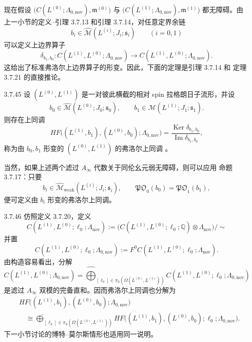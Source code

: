 现在假设
$\bigl(C(L^{(0)};\Lambda_{0,\mathrm{nov}}),\mathfrak m^{(0)}\bigr)$
与
$\bigl(C(L^{(1)};\Lambda_{0,\mathrm{nov}}),\mathfrak m^{(1)}\bigr)$
都无障碍。由上一小节的定义--引理 3.7.13 和引理 3.7.14，对任意定界余链
\[
 b_i\in\widehat{\mathcal M}(L^{(i)};J_i;\mathfrak s_i)
 \qquad(i=0,1)
\]
可以定义上边界算子
\[
 \delta_{b_1,b_0}\colon
 C(L^{(1)},L^{(0)};\Lambda_{0,\mathrm{nov}})
 \longrightarrow
 C(L^{(1)},L^{(0)};\Lambda_{0,\mathrm{nov}}).
\]
这给出了标准弗洛尔上边界算子的形变。因此，下面的定理是引理 3.7.14 和
定理 3.7.21 的直接推论。

\begin{theorem}{3.7.45}\label{thm:3-7-45}
设 $(L^{(0)},L^{(1)})$ 是一对彼此横截的相对 spin 拉格朗日子流形，并设
\[
 b_0\in\widehat{\mathcal M}(L^{(0)};J_0;\mathfrak s_0),
 \qquad
 b_1\in\widehat{\mathcal M}(L^{(1)};J_1;\mathfrak s_1).
\]
则存在上同调
\[
 HF\bigl((L^{(1)},b_1),(L^{(0)},b_0);
 \Lambda_{0,\mathrm{nov}}\bigr)
 =
 \frac{\operatorname{Ker}\delta_{b_1,b_0}}
      {\operatorname{Im}\delta_{b_1,b_0}},
\]
称为由 $b_0,b_1$ 形变的 $(L^{(0)},L^{(1)})$ 的弗洛尔上同调
。
\end{theorem}

当然，如果上述两个滤过 $A_\infty$ 代数关于同伦幺元弱无障碍，则可以应用
命题 3.7.17：只要
\[
 b_i\in\widehat{\mathcal M}_{\mathrm{weak}}
 (L^{(i)};J_i;\mathfrak s_i),
 \qquad
 \mathfrak{PO}_0(b_0)=\mathfrak{PO}_1(b_1),
\]
便可定义由 $b_i$ 形变的弗洛尔上同调。

\begin{remark}{3.7.46}\label{rem:3-7-46}
仿照定义 3.7.20，定义
\[
 C(L^{(1)},L^{(0)};\ell_0;\Lambda_{\mathrm{nov}})
 :=
 \bigl(
 C(L^{(1)},L^{(0)};\ell_0;\mathbb Q)
 \otimes\Lambda_{\mathrm{nov}}
 \bigr)/\sim
\]
并置
\[
 C(L^{(1)},L^{(0)};\ell_0;\Lambda_{0,\mathrm{nov}})
 :=
 F^0C(L^{(1)},L^{(0)};\ell_0;\Lambda_{\mathrm{nov}}).
\]
由构造容易看出，分解
\[
 C(L^{(1)},L^{(0)};\Lambda_{0,\mathrm{nov}})
 =
 \widehat{\bigoplus}_{
 [\ell_0]\in\pi_0(\Omega(L^{(0)},L^{(1)}))}
 C(L^{(1)},L^{(0)};\ell_0;\Lambda_{0,\mathrm{nov}})
\]
是滤过 $A_\infty$ 双模的完备直和。因而弗洛尔上同调也分解为
\begin{equation}
\begin{aligned}
&HF\bigl((L^{(1)},b_1),(L^{(0)},b_0);
 \Lambda_{0,\mathrm{nov}}\bigr)\\
&\quad\cong
 \widehat{\bigoplus}_{
 [\ell_0]\in\pi_0(\Omega(L^{(0)},L^{(1)}))}
 HF\bigl((L^{(1)},b_1),(L^{(0)},b_0);
 \ell_0;\Lambda_{0,\mathrm{nov}}\bigr).
\end{aligned}
\tag{3.7.47}\label{eq:3-7-47}
\end{equation}
下一小节讨论的博特--莫尔斯情形也适用同一说明。
\end{remark}
